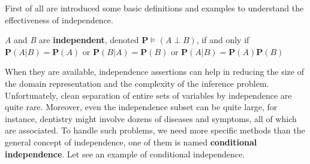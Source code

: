 First of all are introduced some basic definitions and examples to understand the effectiveness of independence.
\begin{definition}
    \textit{A} and \textit{B} are \textbf{independent}, denoted $\mathbf{P} \models (A \perp B)$, if and only if \\
    $\mathbf{P}(A|B) = \mathbf{P}(A)$ or $\mathbf{P}(B|A) = \mathbf{P}(B)$ or $\mathbf{P}(A|B) = \mathbf{P}(A)\mathbf{P}(B)$
\end{definition}
When they are available, independence assertions can help in reducing the size of the domain representation and the complexity of the inference problem. Unfortunately, clean separation of entire sets of variables by independence are quite rare. Moreover, even the independence subset can be quite large, for instance, dentistry might involve dozens of diseases and symptoms, all of which are associated. To handle such problems, we need more specific methods than the general concept of independence, one of them is named \textbf{conditional independence}. Let see an example of conditional independence.

